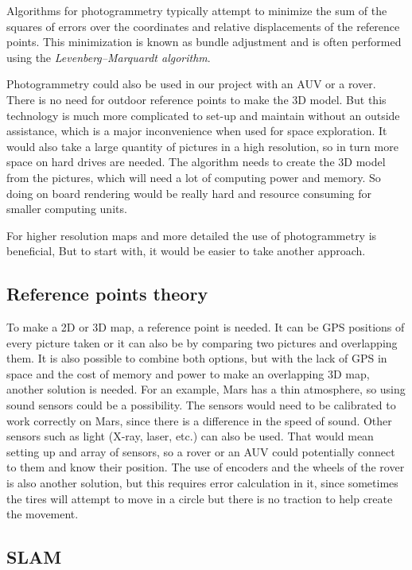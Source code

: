Algorithms for photogrammetry typically attempt to minimize the sum of the squares of errors over the coordinates and relative displacements of the reference points. This minimization is known as bundle adjustment and is often performed using the \textit{Levenberg–Marquardt algorithm}\cite{photo}.

Photogrammetry could also be used in our project with an AUV or a rover. There is no need for outdoor reference points to make the 3D model. But this technology is much more complicated to set-up and maintain without an outside assistance, which is a major inconvenience when used for space exploration. It would also take a large quantity of pictures in a high resolution, so in turn more space on hard drives are needed. The algorithm needs to create the 3D model from the pictures, which will need a lot of computing power and memory. So doing on board rendering would be really hard and resource consuming for smaller computing units.

For higher resolution maps and more detailed the use of photogrammetry is beneficial, But to start with, it would be easier to take another approach. %
\subsection{Reference points theory}

To make a 2D or 3D map, a reference point is needed. It can be GPS positions of every picture taken or it can also be by comparing two pictures and overlapping them. It is also possible to combine both options, but with the lack of GPS in space and the cost of memory and power to make an overlapping 3D map, another solution is needed. For an example, Mars has a thin atmosphere, so using sound sensors could be a possibility. The sensors would need to be calibrated to work correctly on Mars, since there is a difference in the speed of sound. Other sensors such as light (X-ray, laser, etc.) can also be used. That would mean setting up and array of sensors, so a rover or an AUV could potentially connect to them and know their position. The use of encoders and the wheels of the rover is also another solution, but this requires error calculation in it, since sometimes the tires will attempt to move in a circle but there is no traction to help create the movement\cite{reference}.

\subsection{SLAM}

